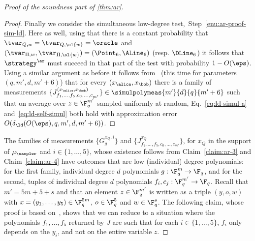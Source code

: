 \begin{proof}[Proof of the soundness part of \cref{thm:ar}]
\begin{proof}
    Finally we consider the simultaneous low-degree
    test,~Step~\ref{enu:ar-proof-sim-ld}.
    Here as well, using that there is a constant probability that $\tvar_{Q,w} =
    \tvar_{Q,\ol{w}} = \oracle$ and $(\tvar_{\Pi,w}, \tvar_{\Pi, \ol{w}}) =
    (\Point_6, \ALine_6)$ (resp.
    $\DLine_6$) it follows that $\strategy^\ar$ must succeed in that part of the
    test with probability $1-O(\eps)$.
    Using a similar argument as before it follows from~
    (this time for parameters $(q,m',d,m'+6)$) that for every
    $(x_\alice,x_\bob)$ there is a family of measurements $\{J^{({x}_\alice,
      {x}_\bob)}_{f_1, \dots, f_5, c_0, \dots, c_{m'}}\} \in
    \simulpolymeas{m'}{d}{q}{m'+6}$ such that on average over $z\in \F_q^{m'}$
    sampled uniformly at random, Eq.~\eqref{eq:ld-simul-a}
    and~\eqref{eq:ld-self-simul} both hold with approximation error
    $O(\delta_{\ld}(O({\eps}), q, m', d, m'+6))$.
  \end{proof}

  The families of measurements $\{G^{x_Q,i}_g\}$ and
  $\{J^{x_Q}_{f_1,\ldots,f_5,c_0,\ldots,c_{m'}}\}$, for $x_Q$ in the support of
  $\mu_\sampler$ and $i\in\{1,\ldots,5\}$, whose existence follows from
  Claim~\ref{claim:ar-3} and Claim~\ref{claim:ar-4} have outcomes that are low
  (individual) degree polynomials: for the first family, individual degree $d$
  polynomials $g:\F_q^m\to \F_q$, and for the second, tuples of individual
  degree $d$ polynomials $f_i,c_j:\F_q^{m'} \to \F_q$.
  Recall that $m' = 5m + 5 +s$ and that an element $z\in \F_q^{m'}$ is written
  as a triple $(y,o,w)$ with $x=(y_1,\ldots,y_5)\in \F_q^{5m}$, $o\in\F_q^5$ and
  $w\in\F_q^s$.
  The following claim, whose proof is based on~, shows
  that we can reduce to a situation where the polynomials $f_1,\ldots,f_5$
  returned by $J$ are such that for each $i\in \{1,\ldots,5\}$, $f_i$ only
  depends on the $y_i$, and not on the entire variable $z$.
	

\end{proof}
